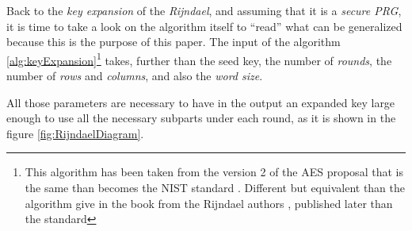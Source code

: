 \documentclass[10pt,a4paper,twoside]{llncs}
\begin{document}
Back to the \emph{key expansion} of the \emph{Rijndael}, and assuming that it is a \emph{secure PRG}, it is time to take a look on the algorithm itself to ``read'' what can be generalized because this is the purpose of this paper. The input of the algorithm \ref{alg:keyExpansion}\footnote{This algorithm has been taken from the version 2 of the AES proposal \cite{Daemen01aes-ammended} that is the same than becomes the NIST standard \cite{AES-FIPS}. Different but equivalent than the algorithm give in the book from the Rijndael authors \cite{Daemen:2002:DR:560131}, published later than the standard} takes, further than the seed key, the number of \emph{rounds}, the number of \emph{rows} and \emph{columns}, and also the \emph{word size}.

All those parameters are necessary to have in the output an expanded key large enough to use all the necessary subparts under each round, as it is shown in the figure \ref{fig:RijndaelDiagram}.
\end{document}
